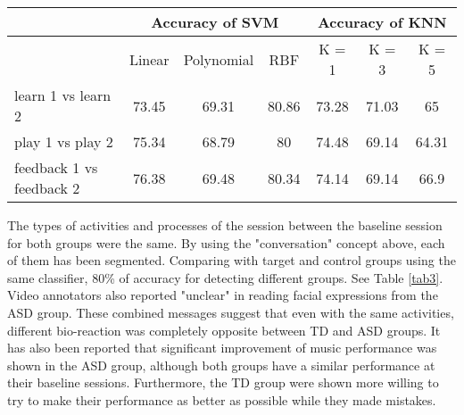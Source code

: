 \begin{table*}[tbp]
	
	\begin{center}
	\caption{classification rate in robot demo, kids play and robot feedback across
			warm up (S1) and music practice (S2) sections.}
			\vspace{3mm}
		\label{tab3}
		\begin{tabular}{lcccccc}
			\multicolumn{1}{c}{\multirow{2}{*}{}} & \multicolumn{3}{c}{Accuracy of SVM} & \multicolumn{3}{c}{Accuracy of KNN} \\
			\hline
			\multicolumn{1}{c}{}                  & Linear   & Polynomial    & RBF    & K = 1   & K = 3     & K = 5     \\
			\hline
			learn 1 vs learn 2                                 & 73.45    & 69.31   & 80.86  & 73.28   & 71.03   & 65      \\
			\hline
			play 1 vs play 2                                 & 75.34    & 68.79   & 80     & 74.48   & 69.14   & 64.31   \\
			\hline
			feedback 1 vs feedback 2                                 & 76.38    & 69.48   & 80.34  & 74.14   & 69.14   & 66.9   
		\end{tabular}
		 
		\label{tab3}
	\end{center}
\end{table*}


The types of activities and processes of the session between the baseline session for both groups were 
the same. By using the "conversation" concept above, each of them has been segmented.
Comparing with target and control groups using the same classifier, 80\% of accuracy for detecting
different groups. See Table \ref{tab3}. Video annotators also reported "unclear" in reading 
facial expressions from the ASD group. These combined messages suggest that even with the same activities,
different bio-reaction was completely opposite between TD and ASD groups. It has 
also been reported that significant improvement of music performance was shown in the ASD group, 
although both groups have a similar performance at their baseline sessions. Furthermore, the TD group 
were shown more willing to try to make their performance as better as possible while they made
mistakes.\\

